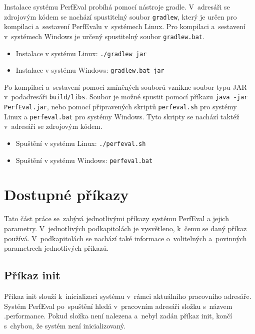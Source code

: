 Instalace systému PerfEval probíhá pomocí nástroje gradle. V~adresáři se zdrojovým kódem se nachází
spustitelný soubor \texttt{gradlew}, který je určen pro kompilaci a~sestavení PerfEvalu v~systémech Linux.
Pro kompilaci a~sestavení v~systémech Windows je určený spustitelný soubor \texttt{gradlew.bat}.

\begin{itemize}
    \item Instalace v systému Linux: \lstinline|./gradlew jar|
    \item Instalace v systému Windows: \lstinline|gradlew.bat jar|
\end{itemize}

Po kompilaci a~sestavení pomocí zmíněných souborů vznikne soubor typu JAR v~podadresáři \texttt{build/libs}.
Soubor je možné spustit pomocí příkazu \texttt{java -jar PerfEval.jar}, nebo pomocí připravených skriptů
\texttt{perfeval.sh} pro systémy Linux a \texttt{perfeval.bat} pro systémy Windows. Tyto skripty se nachází
taktéž v~adresáři se zdrojovým kódem.

\begin{itemize}
    \item Spuštění v systému Linux: \lstinline|./perfeval.sh|
    \item Spuštění v systému Windows: \lstinline|perfeval.bat|
\end{itemize}

\section{Dostupné příkazy}

Tato část práce se~zabývá jednotlivými příkazy systému PerfEval a jejich parametry.
V~jednotlivých podkapitolách je vysvětleno, k~čemu se daný příkaz používá. V~podkapitolách
se nachází také informace o~volitelných a~povinných parametrech jednotlivých příkazů.

\subsection{Příkaz init}

Příkaz init slouží k~inicializaci systému v~rámci aktuálního pracovního adresáře.
Systém PerfEval po~spuštění hledá v~pracovním adresáři složku s~názvem .performance. Pokud složka
není nalezena a~nebyl zadán příkaz init, končí s~chybou, že systém není inicializovaný.

